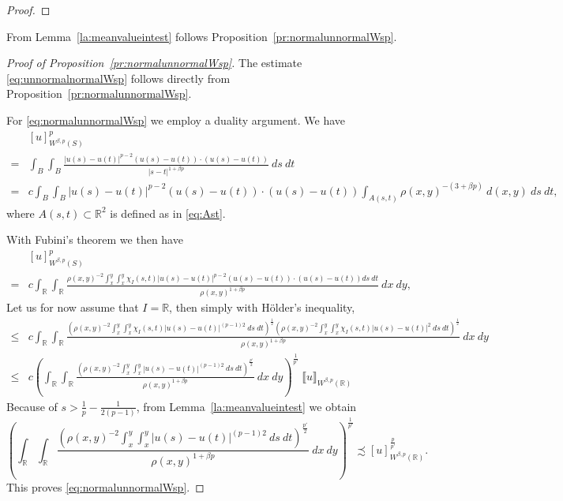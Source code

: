 \documentclass[a4paper,10pt,intlimits,ngerman]{amsart}
\newcommand{\iv}{B} %
\numberwithin{equation}{section}
\newcommand{\R}{\mathbb{R}}
\newcommand{\aleq}{\precsim}
\newcommand{\brac}[1]{\left ( #1 \right )}
\begin{document}
\begin{appendix}
\begin{proof}
\end{proof}

From Lemma~\ref{la:meanvalueintest} follows Proposition~\ref{pr:normalunnormalWsp}.
\begin{proof}[Proof of Proposition~\ref{pr:normalunnormalWsp}]
The estimate \eqref{eq:unnormalnormalWsp} follows directly from Proposition~\ref{pr:normalunnormalWsp}.

For \eqref{eq:normalunnormalWsp} we employ a duality argument. We have
\[
\begin{split}
&[u ]_{W^{\beta,p}(S)}^p\\
=&\int_{\iv}\int_{\iv} \frac{|u(s)-u(t)|^{p-2} (u(s)-u(t)) \cdot (u(s)-u(t))}{|s-t|^{1+\beta p}}\ ds\ dt\\
=&c\int_{\iv}\int_{\iv} |u(s)-u(t)|^{p-2} (u(s)-u(t)) \cdot (u(s)-u(t)) \int_{A(s,t)} \rho(x,y)^{-(3+\beta p)}\ d(x,y)\ ds\ dt,
\end{split}
\]
where $A(s,t) \subset \R^2$ is defined as in \eqref{eq:Ast}.

With Fubini's theorem we then have
\[
\begin{split}
&[u ]_{W^{\beta,p}(S)}^p\\
=&c\int_{\R} \int_{\R} \frac{\rho(x,y)^{-2} \int_x^y\int_x^y \chi_{I}(s,t) |u(s)-u(t)|^{p-2} (u(s)-u(t)) \cdot (u(s)-u(t)) ds\ dt}{\rho(x,y)^{1+\beta p}}\ dx\ dy,
\end{split}
\]
Let us for now assume that $I = \R$, then simply with H\"older's inequality,
\[
\begin{split}
\leq&c\int_{\R} \int_{\R} \frac{\brac{\rho(x,y)^{-2} \int_x^y\int_x^y \chi_{I}(s,t)|u(s)-u(t)|^{(p-1)2}\ ds\ dt}^{\frac{1}{2}} \brac{\rho(x,y)^{-2} \int_x^y\int_x^y \chi_{I}(s,t)|u(s)-u(t)|^{2}\ ds\ dt}^{\frac{1}{2}}}{\rho(x,y)^{1+\beta p}}\ dx\ dy\\
\leq&c\brac{\int_{\R} \int_{\R} \frac{\brac{\rho(x,y)^{-2} \int_x^y\int_x^y |u(s)-u(t)|^{(p-1)2}\ ds\ dt}^{\frac{p'}{2}} }{\rho(x,y)^{1+\beta p}}\ dx\ dy}^{\frac{1}{p'}}\ \llbracket u \rrbracket_{W^{\beta,p}(\R)}
\end{split}
\]
Because of  $s > \frac{1}{p}-\frac{1}{2(p-1)}$, from Lemma~\ref{la:meanvalueintest}  we obtain
\[
 \brac{\int_{\R} \int_{\R} \frac{\brac{\rho(x,y)^{-2} \int_x^y\int_x^y |u(s)-u(t)|^{(p-1)2}\ ds\ dt}^{\frac{p'}{2}} }{\rho(x,y)^{1+\beta p}}\ dx\ dy}^{\frac{1}{p'}} \aleq [u]_{W^{\beta,p}(\R)}^{\frac{p}{p'}}.
\]
This proves \eqref{eq:normalunnormalWsp}.


\end{proof}
\end{appendix}
\end{document}
